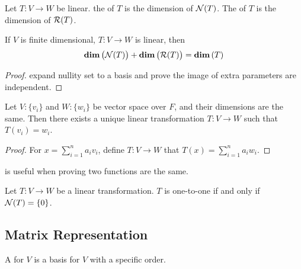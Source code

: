 \begin{definition}
	Let $T: V \rightarrow W$ be linear. the   of $T$ is the dimension of $\mathcal{N}(T)$. The  \label{rankdefinition} of $T$ is the dimension of $\mathcal{R}(T)$.
\end{definition}

\begin{theorem}
	If $V$ is finite dimensional, $T:V\rightarrow W$ is linear, then
	\begin{equation}
		\displaystyle \mathbf{dim}\left( \mathcal{N}(T) \right) + \displaystyle \mathbf{dim}\left( \mathcal{R}(T) \right) = \displaystyle \mathbf{dim}\left( T \right)
	\end{equation}
\end{theorem}

\begin{proof}
	expand nullity set to a basis and prove the image of extra parameters are independent.
\end{proof}

\begin{theorem}\label{uniquelineartransformation}
	Let $V:\{v_i \}$ and $W:\{w_i \}$ be vector space over $F$, and their dimensions are the same. Then there exists a unique linear transformation $T:V \rightarrow W$ such that $T(v_i) = w_i$.
\end{theorem}

\begin{proof}
    For $\displaystyle x = \sum_{i=1}^{n} a_i v_i$, define $T:V \rightarrow W$ that $\displaystyle T(x) = \sum_{i=1}^n a_i w_i$.
\end{proof}

 is useful when proving two functions are the same.


\begin{theorem}
    Let $T: V \rightarrow W$ be a linear transformation. $T$ is one-to-one if and only if $\mathcal{N}(T) = \{ 0 \}$.    
\end{theorem}







\subsection{Matrix Representation}

\begin{definition}
	A   for $V$ is a basis for $V$ with a specific order.
\end{definition}

